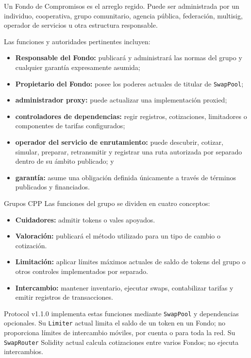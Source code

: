 \documentclass[11pt]{article}
\begin{document}
Un Fondo de Compromisos es el arreglo regido. Puede ser administrada por un individuo, cooperativa, grupo comunitario, agencia pública, federación, multisig, operador de servicios u otra estructura responsable.

Las funciones y autoridades pertinentes incluyen:

\begin{itemize}[leftmargin=*]
\item \textbf{Responsable del Fondo:} publicará y administrará las normas del grupo y cualquier garantía expresamente asumida;
\item \textbf{Propietario del Fondo:} posee los poderes actuales de titular de \texttt{SwapPool};
\item \textbf{administrador proxy:} puede actualizar una implementación proxied;
\item \textbf{controladores de dependencias:} regir registros, cotizaciones, limitadores o componentes de tarifas configurados;
\item \textbf{operador del servicio de enrutamiento:} puede descubrir, cotizar, simular, preparar, retransmitir y registrar una ruta autorizada por separado dentro de su ámbito publicado; y
\item \textbf{garantía:} asume una obligación definida únicamente a través de términos publicados y financiados.
\end{itemize}
Grupos CPP Las funciones del grupo se dividen en cuatro conceptos:

\begin{itemize}[leftmargin=*]
\item \textbf{Cuidadores:} admitir tokens o vales apoyados.
\item \textbf{Valoración:} publicará el método utilizado para un tipo de cambio o cotización.
\item \textbf{Limitación:} aplicar límites máximos actuales de saldo de tokens del grupo o otros controles implementados por separado.
\item \textbf{Intercambio:} mantener inventario, ejecutar swaps, contabilizar tarifas y emitir registros de transacciones.
\end{itemize}
Protocol v1.1.0 implementa estas funciones mediante \texttt{SwapPool} y dependencias opcionales. Su \texttt{Limiter} actual limita el saldo de un token en un Fondo; no proporciona límites de intercambio móviles, por cuenta o para toda la red. Su \texttt{SwapRouter} Solidity actual calcula cotizaciones entre varios Fondos; no ejecuta intercambios.
\end{document}
